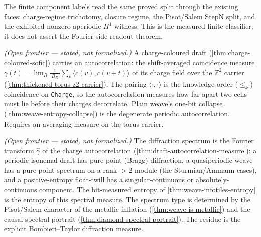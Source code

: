 \begin{theorem}\label{thm:finite-diffraction-classifier-agreement}\leanok{}
The finite component labels read the same proved split through the existing
faces: charge-regime trichotomy, closure regime, the Pisot/Salem StepN split,
and the exhibited nonzero aperiodic \(H^1\) witness.  This is the measured
finite classifier; it does not assert the Fourier-side readout theorem.
\end{theorem}

\begin{theorem}\label{thm:draft-autocorrelation-measure}\notready{}
\emph{(Open frontier --- stated, not formalized.)} A charge-coloured draft
(\cref{thm:charge-coloured-sofic}) carries an autocorrelation: the shift-averaged
coincidence measure $\gamma(t)=\lim_{R}\frac{1}{|B_R|}\sum_{v}\langle c(v),c(v+t)\rangle$ of
its charge field over the $\mathbb{Z}^2$ carrier (\cref{thm:thickened-torus-z2-carrier}).
The pairing $\langle\cdot,\cdot\rangle$ is the knowledge-order ($\leq_k$) coincidence on
\texttt{Charge}, so the autocorrelation measures how far apart two cells must lie before
their charges decorrelate. Plain weave's one-bit collapse
(\cref{thm:weave-entropy-collapse}) is the degenerate periodic autocorrelation. Requires an
averaging measure on the torus carrier.
\end{theorem}

\begin{theorem}\label{thm:draft-diffraction-spectrum}\notready{}
\emph{(Open frontier --- stated, not formalized.)} The diffraction spectrum is
the Fourier transform $\widehat{\gamma}$ of the charge autocorrelation
(\cref{thm:draft-autocorrelation-measure}): a periodic isonemal draft has pure-point
(Bragg) diffraction, a quasiperiodic weave has a pure-point spectrum on a rank-$>2$ module
(the Sturmian/Ammann cases), and a positive-entropy float-twill has a singular-continuous
or absolutely-continuous component. The bit-measured entropy of
\cref{thm:weave-infotiles-entropy} is the entropy of this spectral measure.  The
spectrum type is determined by the Pisot/Salem character of the metallic
inflation (\cref{thm:weave-is-metallic}) and the causal-spectral portrait
(\cref{thm:diamond-spectral-portrait}).  The residue is the explicit
Bombieri--Taylor diffraction measure.
\end{theorem}
